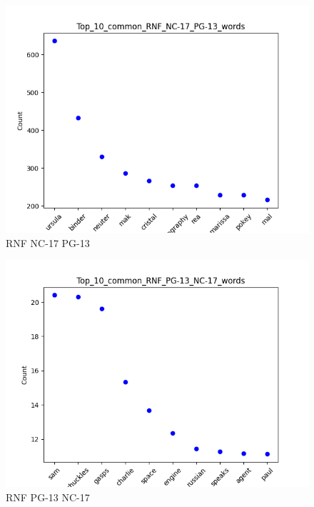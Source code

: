 \documentclass[a4paper]{article}
\begin{document}
\begin{figure}[ht]
    \centering
    \includegraphics[width=1\textwidth]{../stats/Top_10_common_RNF_NC-17_PG-13_words.png}
    \caption{RNF NC-17 PG-13}
\end{figure}


\begin{figure}[ht]
    \centering
    \includegraphics[width=1\textwidth]{../stats/Top_10_common_RNF_PG-13_NC-17_words.png}
    \caption{RNF PG-13 NC-17}
\end{figure}
\end{document}
